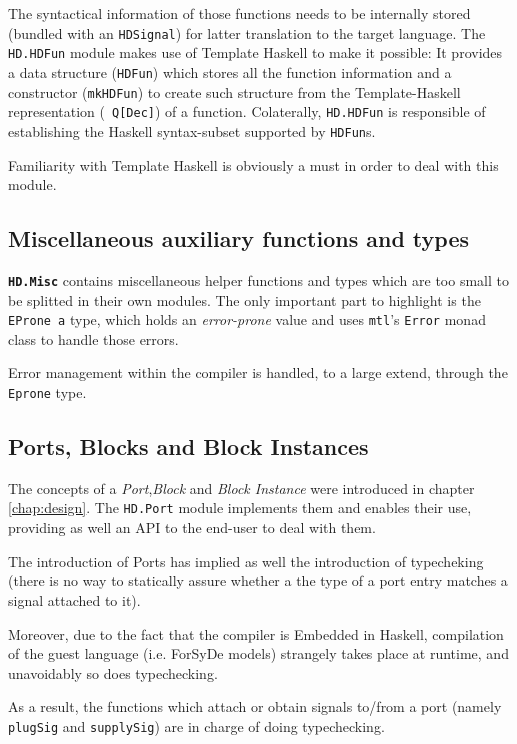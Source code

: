 \begin{itemize}
  The syntactical information of those functions needs to be
  internally stored (bundled with an \texttt{HDSignal}) for latter
  translation to the target language. The \texttt{HD.HDFun} module
  makes use of Template Haskell to make it possible: It provides a
  data structure (\texttt{HDFun}) which stores all the function
  information and a constructor (\texttt{mkHDFun}) to create such
  structure from the Template-Haskell representation
  (~\texttt{Q[Dec]}) of a function.  Colaterally, \texttt{HD.HDFun} is
  responsible of establishing the Haskell syntax-subset supported by
  \texttt{HDFun}s.

  Familiarity with Template Haskell is obviously a must in order to
  deal with this module.
\end{itemize}

\subsection{Miscellaneous auxiliary functions and types}

\texttt{\textbf{HD.Misc}} contains miscellaneous helper functions and
types which are too small to be splitted in their own modules.  The
only important part to highlight is the \texttt{EProne a} type, which
holds an \textit{error-prone} value and uses \texttt{mtl}'s
\texttt{Error} monad class to handle those errors.
  
Error management within the compiler is handled, to a large extend,
through the \texttt{Eprone} type.

\subsection{Ports, Blocks and Block Instances}
The concepts of a \textit{Port},\textit{Block} and \textit{Block
  Instance} were introduced in chapter \ref{chap:design}. The
\texttt{HD.Port} module implements them and enables their use,
providing as well an API to the end-user to deal with them.

The introduction of Ports has implied as well the introduction of
typecheking (there is no way to statically assure whether a the type
of a port entry matches a signal attached to it).

Moreover, due to the fact that the compiler is Embedded in Haskell,
compilation of the guest language (i.e. ForSyDe models) strangely
takes place at runtime, and unavoidably so does typechecking. 

As a result, the functions which attach or obtain signals to/from a
port (namely \texttt{plugSig} and \texttt{supplySig}) are in charge of doing
typechecking.

